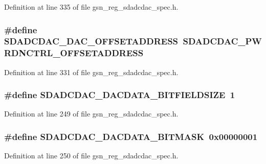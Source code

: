 Definition at line 335 of file gsn\_\-reg\_\-sdadcdac\_\-spec.h.

\hypertarget{a00569_a3707374c7557819bd86d9285172d3077}{
\subsubsection[{SDADCDAC\_\-DAC\_\-OFFSETADDRESS}]{\setlength{\rightskip}{0pt plus 5cm}\#define SDADCDAC\_\-DAC\_\-OFFSETADDRESS~SDADCDAC\_\-PWRDNCTRL\_\-OFFSETADDRESS}}
\label{a00569_a3707374c7557819bd86d9285172d3077}


Definition at line 331 of file gsn\_\-reg\_\-sdadcdac\_\-spec.h.

\hypertarget{a00569_ab7346e10a5a23f70f511b8e31ad6ab52}{
\subsubsection[{SDADCDAC\_\-DACDATA\_\-BITFIELDSIZE}]{\setlength{\rightskip}{0pt plus 5cm}\#define SDADCDAC\_\-DACDATA\_\-BITFIELDSIZE~1}}
\label{a00569_ab7346e10a5a23f70f511b8e31ad6ab52}


Definition at line 249 of file gsn\_\-reg\_\-sdadcdac\_\-spec.h.

\hypertarget{a00569_a13c375cd8751db96f464dcebcae5d43a}{
\subsubsection[{SDADCDAC\_\-DACDATA\_\-BITMASK}]{\setlength{\rightskip}{0pt plus 5cm}\#define SDADCDAC\_\-DACDATA\_\-BITMASK~0x00000001}}
\label{a00569_a13c375cd8751db96f464dcebcae5d43a}


Definition at line 250 of file gsn\_\-reg\_\-sdadcdac\_\-spec.h.

